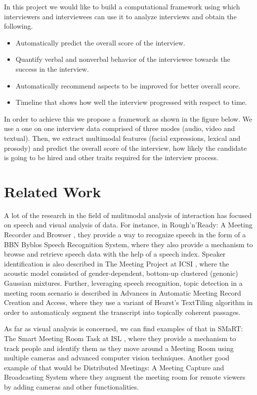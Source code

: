 \documentclass[11pt]{article}
\begin{document}
In this project we would like to build a computational framework using which interviewers and interviewees can use it to analyze interviews and obtain the following.
\begin{itemize}
\item Automatically predict the overall score of the interview.
\item Quantify verbal and nonverbal behavior of the interviewee towards the success in the interview.
\item Automatically recommend aspects to be improved for better overall score. 
\item Timeline that shows how well the interview progressed with respect to time.
\end{itemize}

In order to achieve this we propose a framework as shown in the figure below. We use a one on one interview data comprised of three modes (audio, video and textual). Then, we extract multimodal features (facial expressions, lexical and prosody) and predict the overall score of the interview, how likely the candidate is going to be hired and other traits required for the interview process.


\section{Related Work}
A lot of the research in the field of mulitmodal analysis of interaction has focused on speech and visual analysis of data. For instance, in Rough'n'Ready: A Meeting Recorder and Browser \cite{kubala1999rough}, they provide a way to recognize speech in the form of a BBN Byblos Speech Recognition System, where they also provide a mechanism to browse and retrieve speech data with the help of a speech index. Speaker identification is also described in The Meeting Project at ICSI \cite{morgan2001meeting}, where the acoustic model consisted of gender-dependent, bottom-up clustered (genonic) Gaussian mixtures. Further, leveraging speech recognition, topic detection in a meeting room scenario is described in Advances in Automatic Meeting Record Creation and Access, where they use a variant of Hearst's TextTiling algorithm in order to automaticaly segment the transcript into topically coherent passages.

As far as visual analysis is concerned, we can find examples of that in SMaRT: The Smart Meeting Room Task at ISL \cite{waibel2003smart}, where they provide a mechanism to track people and identify them as they move around a Meeting Room using multiple cameras and advanced computer vision techniques. Another good example of that would be Distributed Meetings: A Meeting Capture and Broadcasting System \cite{cutler2002distributed} where they augment the meeting room for remote viewers by adding cameras and other functionalities.
\end{document}

